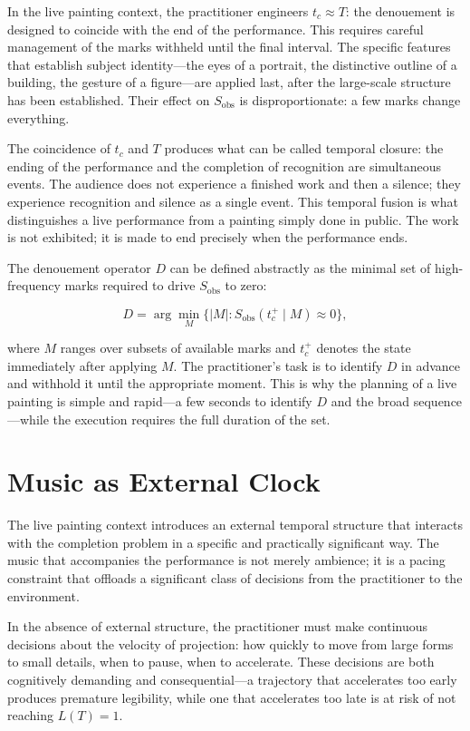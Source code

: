 \documentclass[11pt, twoside]{article}
\theoremstyle{plain}
\theoremstyle{definition}
\theoremstyle{remark}
\begin{document}
In the live painting context, the practitioner engineers $t_c \approx T$: the denouement is designed to coincide with the end of the performance. This requires careful management of the marks withheld until the final interval. The specific features that establish subject identity---the eyes of a portrait, the distinctive outline of a building, the gesture of a figure---are applied last, after the large-scale structure has been established. Their effect on $S_{\text{obs}}$ is disproportionate: a few marks change everything.

The coincidence of $t_c$ and $T$ produces what can be called temporal closure: the ending of the performance and the completion of recognition are simultaneous events. The audience does not experience a finished work and then a silence; they experience recognition and silence as a single event. This temporal fusion is what distinguishes a live performance from a painting simply done in public. The work is not exhibited; it is made to end precisely when the performance ends.

The denouement operator $D$ can be defined abstractly as the minimal set of high-frequency marks required to drive $S_{\text{obs}}$ to zero:

\[
D = \arg\min_{M} \{ |M| : S_{\text{obs}}(t_c^+ \mid M) \approx 0 \},
\]

where $M$ ranges over subsets of available marks and $t_c^+$ denotes the state immediately after applying $M$. The practitioner's task is to identify $D$ in advance and withhold it until the appropriate moment. This is why the planning of a live painting is simple and rapid---a few seconds to identify $D$ and the broad sequence---while the execution requires the full duration of the set.

\section{Music as External Clock}
\label{sec:music}

The live painting context introduces an external temporal structure that interacts with the completion problem in a specific and practically significant way. The music that accompanies the performance is not merely ambience; it is a pacing constraint that offloads a significant class of decisions from the practitioner to the environment.

In the absence of external structure, the practitioner must make continuous decisions about the velocity of projection: how quickly to move from large forms to small details, when to pause, when to accelerate. These decisions are both cognitively demanding and consequential---a trajectory that accelerates too early produces premature legibility, while one that accelerates too late is at risk of not reaching $L(T) = 1$.
\end{document}
